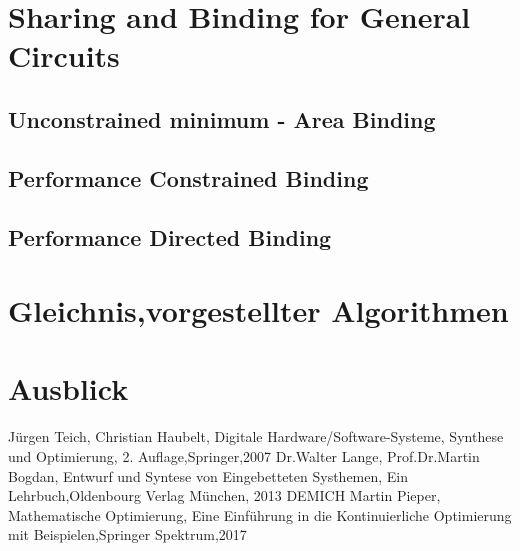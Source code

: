 \documentclass[conference]{IEEEtran}
\begin{document}
\section{Sharing and Binding for General Circuits}
\subsection{Unconstrained minimum - Area Binding}
\subsection{Performance Constrained Binding}
\subsection{Performance Directed Binding}
\section{Gleichnis,vorgestellter Algorithmen}
\section{Ausblick}

\begin{thebibliography}{00}
 Jürgen Teich, Christian Haubelt, Digitale Hardware/Software-Systeme, Synthese und Optimierung, 2. Auflage,Springer,2007
 Dr.Walter Lange, Prof.Dr.Martin Bogdan, Entwurf und Syntese von Eingebetteten Systhemen, Ein Lehrbuch,Oldenbourg Verlag München, 2013
 DEMICH
 Martin Pieper, Mathematische Optimierung, Eine Einführung in die Kontinuierliche Optimierung mit Beispielen,Springer Spektrum,2017
\end{thebibliography}
\listoffigures
\listoftables
\vspace{12pt}
\end{document}
